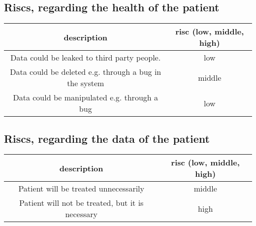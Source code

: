 \subsection{Riscs, regarding the health of the patient}
\begin{tabular}{|c|c|}
	\hline
	description & risc (low, middle, high) \\
	\hline
	Data could be leaked to third party people. & low \\
	Data could be deleted e.g. through a bug in the system & middle \\
	Data could be manipulated e.g. through a bug & low \\
	\hline
\end{tabular}


\subsection{Riscs, regarding the data of the patient}


\begin{tabular}{|c|c|}
	\hline
	description & risc (low, middle, high) \\
	\hline
	Patient will be treated unnecessarily & middle \\
	Patient will not be treated, but it is necessary & high \\
	\hline
\end{tabular}
